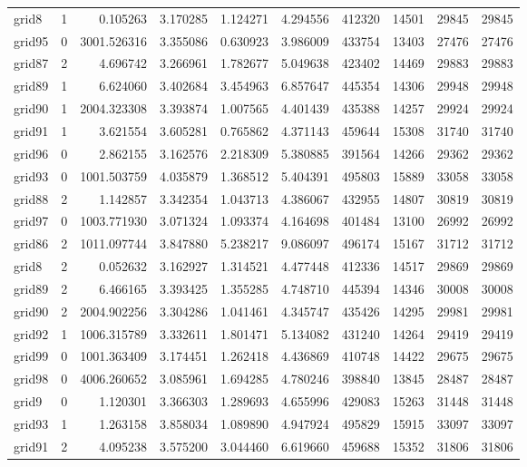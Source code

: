 \documentclass[../../../thesis.tex]{subfiles}
\begin{document}
\begin{longtable}{|l|r|r|r|r|r|r|r|r|r|}
grid8 & 1 & 0.105263 & 3.170285 & 1.124271 & 4.294556 & 412320 & 14501 & 29845 & 29845 \\
grid95 & 0 & 3001.526316 & 3.355086 & 0.630923 & 3.986009 & 433754 & 13403 & 27476 & 27476 \\
grid87 & 2 & 4.696742 & 3.266961 & 1.782677 & 5.049638 & 423402 & 14469 & 29883 & 29883 \\
grid89 & 1 & 6.624060 & 3.402684 & 3.454963 & 6.857647 & 445354 & 14306 & 29948 & 29948 \\
grid90 & 1 & 2004.323308 & 3.393874 & 1.007565 & 4.401439 & 435388 & 14257 & 29924 & 29924 \\
grid91 & 1 & 3.621554 & 3.605281 & 0.765862 & 4.371143 & 459644 & 15308 & 31740 & 31740 \\
grid96 & 0 & 2.862155 & 3.162576 & 2.218309 & 5.380885 & 391564 & 14266 & 29362 & 29362 \\
grid93 & 0 & 1001.503759 & 4.035879 & 1.368512 & 5.404391 & 495803 & 15889 & 33058 & 33058 \\
grid88 & 2 & 1.142857 & 3.342354 & 1.043713 & 4.386067 & 432955 & 14807 & 30819 & 30819 \\
grid97 & 0 & 1003.771930 & 3.071324 & 1.093374 & 4.164698 & 401484 & 13100 & 26992 & 26992 \\
grid86 & 2 & 1011.097744 & 3.847880 & 5.238217 & 9.086097 & 496174 & 15167 & 31712 & 31712 \\
grid8 & 2 & 0.052632 & 3.162927 & 1.314521 & 4.477448 & 412336 & 14517 & 29869 & 29869 \\
grid89 & 2 & 6.466165 & 3.393425 & 1.355285 & 4.748710 & 445394 & 14346 & 30008 & 30008 \\
grid90 & 2 & 2004.902256 & 3.304286 & 1.041461 & 4.345747 & 435426 & 14295 & 29981 & 29981 \\
grid92 & 1 & 1006.315789 & 3.332611 & 1.801471 & 5.134082 & 431240 & 14264 & 29419 & 29419 \\
grid99 & 0 & 1001.363409 & 3.174451 & 1.262418 & 4.436869 & 410748 & 14422 & 29675 & 29675 \\
grid98 & 0 & 4006.260652 & 3.085961 & 1.694285 & 4.780246 & 398840 & 13845 & 28487 & 28487 \\
grid9 & 0 & 1.120301 & 3.366303 & 1.289693 & 4.655996 & 429083 & 15263 & 31448 & 31448 \\
grid93 & 1 & 1.263158 & 3.858034 & 1.089890 & 4.947924 & 495829 & 15915 & 33097 & 33097 \\
grid91 & 2 & 4.095238 & 3.575200 & 3.044460 & 6.619660 & 459688 & 15352 & 31806 & 31806 \\

\end{longtable}
\end{document}
